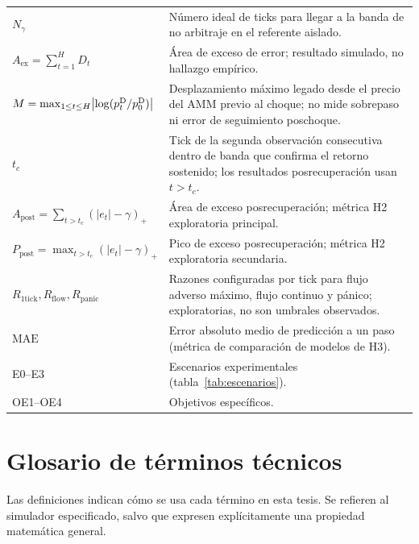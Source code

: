 \begin{center}
\begin{tabularx}{\textwidth}{@{}l X@{}}
$N_\gamma$ & Número ideal de ticks para llegar a la banda de no arbitraje en el referente aislado. \\
$A_{\mathrm{ex}} = \sum_{t=1}^{H} D_t$ & Área de exceso de error; resultado simulado, no hallazgo empírico. \\
$M = \max_{1\le t\le H}\bigl|\log(p^{\mathrm{D}}_t/p^{\mathrm{D}}_0)\bigr|$ & Desplazamiento máximo legado desde el precio del AMM previo al choque; no mide sobrepaso ni error de seguimiento poschoque. \\
$t_c$ & Tick de la segunda observación consecutiva dentro de banda que confirma el retorno sostenido; los resultados posrecuperación usan $t>t_c$. \\
$A_{\mathrm{post}}=\sum_{t>t_c}(|e_t|-\gamma)_+$ & Área de exceso posrecuperación; métrica H2 exploratoria principal. \\
$P_{\mathrm{post}}=\max_{t>t_c}(|e_t|-\gamma)_+$ & Pico de exceso posrecuperación; métrica H2 exploratoria secundaria. \\
$R_{\mathrm{1tick}},R_{\mathrm{flow}},R_{\mathrm{panic}}$ & Razones configuradas por tick para flujo adverso máximo, flujo continuo y pánico; exploratorias, no son umbrales observados. \\
$\mathrm{MAE}$ & Error absoluto medio de predicción a un paso (métrica de comparación de modelos de H3). \\
E0--E3 & Escenarios experimentales (tabla~\ref{tab:escenarios}). \\
OE1--OE4 & Objetivos específicos. \\
\bottomrule
\end{tabularx}
\end{center}

\section*{Glosario de términos técnicos}
{}

\begingroup
\small
\setlength{\parskip}{0.15em}
Las definiciones indican cómo se usa cada término en esta tesis. Se refieren al
simulador especificado, salvo que expresen explícitamente una propiedad matemática general.

